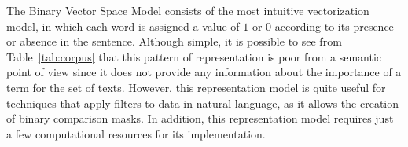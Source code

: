 \documentclass{ieeeaccess}
\begin{document}

The Binary Vector Space Model consists of the most intuitive vectorization model, in which each word is assigned a value of $ 1 $ or $ 0 $ according to its presence or absence in the sentence. Although simple, it is possible to see from Table~\ref{tab:corpus} that this pattern of representation is poor from a semantic point of view since it does not provide any information about the importance of a term for the set of texts. However, this representation model is quite useful for techniques that apply filters to data in natural language, as it allows the creation of binary comparison masks. In addition, this representation model requires just a few computational resources for its implementation.

\end{document}

